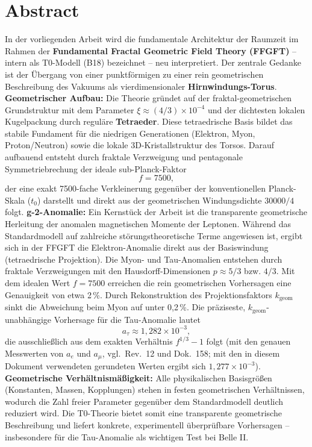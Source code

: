 \section*{Abstract}
		In der vorliegenden Arbeit wird die fundamentale Architektur der Raumzeit im Rahmen der \textbf{Fundamental Fractal Geometric Field Theory (FFGFT)} – intern als T0-Modell (B18) bezeichnet – neu interpretiert. Der zentrale Gedanke ist der Übergang von einer punktförmigen zu einer rein geometrischen Beschreibung des Vakuums als vierdimensionaler \textbf{Hirnwindungs-Torus}.
		\textbf{Geometrischer Aufbau:} Die Theorie gründet auf der fraktal-geometrischen Grundstruktur mit dem Parameter $\xi \approx (4/3)\times 10^{-4}$ und der dichtesten lokalen Kugelpackung durch reguläre \textbf{Tetraeder}. Diese tetraedrische Basis bildet das stabile Fundament für die niedrigen Generationen (Elektron, Myon, Proton/Neutron) sowie die lokale 3D-Kristallstruktur des Torsos. Darauf aufbauend entsteht durch fraktale Verzweigung und pentagonale Symmetriebrechung der ideale sub-Planck-Faktor
		\begin{equation*}
			f = 7500,
		\end{equation*}
		der eine exakt 7500-fache Verkleinerung gegenüber der konventionellen Planck-Skala ($t_0$) darstellt und direkt aus der geometrischen Windungsdichte $30000/4$ folgt.
		\textbf{g-2-Anomalie:} Ein Kernstück der Arbeit ist die transparente geometrische Herleitung der anomalen magnetischen Momente der Leptonen. Während das Standardmodell auf zahlreiche störungstheoretische Terme angewiesen ist, ergibt sich in der FFGFT die Elektron-Anomalie direkt aus der Basiswindung (tetraedrische Projektion). Die Myon- und Tau-Anomalien entstehen durch fraktale Verzweigungen mit den Hausdorff-Dimensionen $p \approx 5/3$ bzw. $4/3$. Mit dem idealen Wert $f = 7500$ erreichen die rein geometrischen Vorhersagen eine Genauigkeit von etwa 2\,\%. Durch Rekonstruktion des Projektionsfaktors $k_\text{geom}$ sinkt die Abweichung beim Myon auf unter 0{,}2\,\%. Die präziseste, $k_\text{geom}$-unabhängige Vorhersage für die Tau-Anomalie lautet
		\begin{equation*}
			a_\tau \approx 1{,}282 \times 10^{-3},
		\end{equation*}
		die ausschließlich aus dem exakten Verhältnis $f^{1/3} - 1$ folgt (mit den genauen Messwerten von $a_e$ und $a_\mu$, vgl.\ Rev.~12 und Dok.~158; mit den in diesem Dokument verwendeten gerundeten Werten ergibt sich $1{,}277 \times 10^{-3}$).
		\textbf{Geometrische Verhältnismäßigkeit:} Alle physikalischen Basisgrößen (Konstanten, Massen, Kopplungen) stehen in festen geometrischen Verhältnissen, wodurch die Zahl freier Parameter gegenüber dem Standardmodell deutlich reduziert wird. Die T0-Theorie bietet somit eine transparente geometrische Beschreibung und liefert konkrete, experimentell überprüfbare Vorhersagen – insbesondere für die Tau-Anomalie als wichtigen Test bei Belle II.

